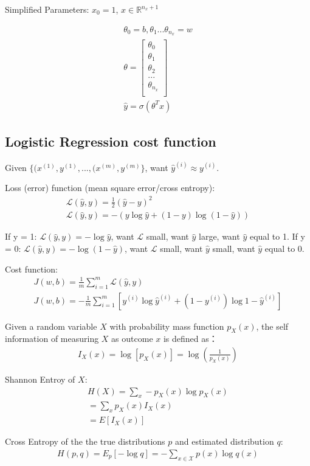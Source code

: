Simplified Parameters:
	$x_0 = 1$, $x \in \mathbb{R}^{{n_x} + 1}$

\begin{align}
	\theta_0 = b, \theta_1 ... \theta_{n_x} = w \\
	\theta = \begin{bmatrix} 
				\theta_0 \\
				\theta_1 \\
				\theta_2 \\
				...      \\
				\theta_{n_x} \\
	         \end{bmatrix} \\
	\hat{y} = \sigma{(\theta^Tx)}
\end{align}


\subsection{Logistic Regression cost function}

Given $\{ (x^{(1)}, y^{(1)}, ..., (x^{(m)}, y^{(m)} \}$,
want $\hat{y}^{(i)} \approx {y}^{(i)}$.

Loss (error) function (mean square error/cross entropy):
\begin{align}
	\mathcal{L}(\hat{y}, y) = \frac{1}{2}(\hat{y} - y)^2  \\
	\mathcal{L}(\hat{y}, y) = -(y\log{\hat{y}} + (1-y)\log(1 - \hat{y}))
\end{align}

If y = 1: $\mathcal{L}(\hat{y}, y) = -\log{\hat{y}}$, 
want $\mathcal{L}$ small, want $\hat{y}$ large, want $\hat{y}$ equal to 1.  
If y = 0: $\mathcal{L}(\hat{y}, y) = -\log{(1 - \hat{y})}$,
want $\mathcal{L}$ small, want $\hat{y}$ small, want  $\hat{y}$ equal to 0. 


Cost function:
\begin{align}
	J(w, b) = \frac{1}{m} \displaystyle\sum_{i=1}^m \mathcal{L}(\hat{y}, y) \\
	J(w, b) = - \frac{1}{m} \displaystyle\sum_{i=1}^m [y^{(i)}\log{\hat{y}^{(i)}} + (1 - y^{(i)})\log{1 - \hat{y}^{(i)}}]
\end{align}

Given a random variable $X$ with probability mass function $p_X(x)$, 
the self information of measuring $X$ as outcome $x$ is defined as：
\begin{align}
	I_X(x) = \log[p_X(x)] = \log(\frac{1}{p_X(x)})
\end{align}

Shannon Entroy of $X$:
\begin{align}
	H(X) = \sum_{x} -p_X(x)\log{p_X(x)} \\
	= \sum_{x} p_X(x)I_X(x) \\
	= E[I_X(x)]
\end{align}

Cross Entropy of the the true distributions $p$ and estimated distribution $q$:
\begin{align}
	H(p, q) = E_p[-\log{q}] = -\sum_{x \in \mathcal X} p(x) \log{q(x)}
\end{align}